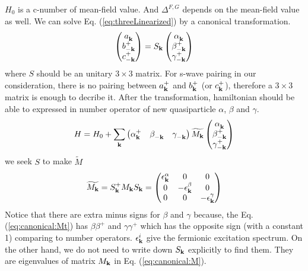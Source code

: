 $H_{0}$ is a c-number of mean-field value.  And $\Delta^{F,G}$ depends on the mean-field value as well.  We can solve Eq. (\ref{eq:threeLinearized}) by a canonical transformation.  
\begin{equation}
  \begin{pmatrix}a^{}_{\mathbf{k}}\\b^{+}_{-\mathbf{k}}\\c^{+}_{-\mathbf{k}}\end{pmatrix}=S_{\mathbf{k}}  
  \begin{pmatrix}\alpha^{}_{\mathbf{k}}\\\beta^{+}_{-\mathbf{k}}\\\gamma^{+}_{-\mathbf{k}}\end{pmatrix}
  \end{equation}
where $S$ should be an unitary $3\times3$ matrix.  For s-wave pairing in our consideration, there is no pairing between $a^{+}_{\mathbf{k}}$ and $b^{+}_{\mathbf{k}}$ (or $c^{+}_{\mathbf{k}}$), therefore a $3\times3$ matrix is enough to decribe it.  After the transformation, hamiltonian should be able to expressed in number operator of new quasiparticle $\alpha$, $\beta$ and $\gamma$.   
\begin{equation}\label{eq:canonical:Mt}
H=H_{0}+\sum_{\mathbf{k}}
 \begin{pmatrix}\alpha^{+}_{\mathbf{k}}&\beta^{}_{-\mathbf{k}}&\gamma^{}_{-\mathbf{k}}\end{pmatrix}
\widetilde{M_{\mathbf{k}}}
   \begin{pmatrix}\alpha^{}_{\mathbf{k}}\\\beta^{+}_{-\mathbf{k}}\\\gamma^{+}_{-\mathbf{k}}\end{pmatrix}
\end{equation}
we seek $S$ to make $\widetilde{M}$
\begin{equation}
 \widetilde{M_{\mathbf{k}}}=S^{+}_{\mathbf{k}}M_{\mathbf{k}}S_{\mathbf{k}}=
 \begin{pmatrix}\epsilon^{\alpha}_{\mathbf{k}}&0&0\\0&-\epsilon^{\beta}_{\mathbf{k}}&0\\0&0&-\epsilon^{\gamma}_{\mathbf{k}}\end{pmatrix}
 \end{equation}
Notice that there are extra minus signs for $\beta$ and $\gamma$ because, the Eq. (\ref{eq:canonical:Mt}) has $\beta\beta^{+}$ and $\gamma\gamma^{+}$ which has the opposite sign (with a constant 1) comparing to number operators.  $\epsilon^{i}_{\mathbf{k}}$ give the fermionic excitation spectrum.  On the other hand, we do not need to write down $S_{\mathbf{k}}$ explicitly to find them.  They are eigenvalues of matrix $M_{\mathbf{k}}$ in Eq. (\ref{eq:canonical:M}). 

